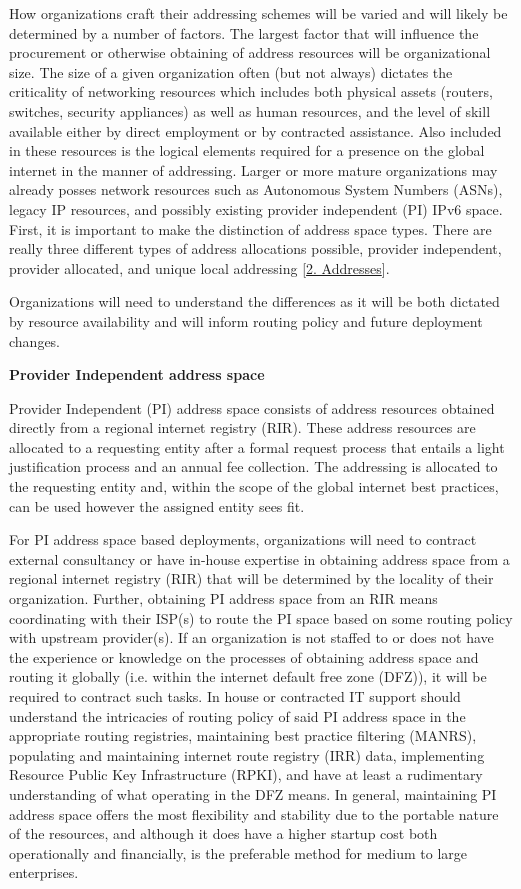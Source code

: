 \documentclass[
]{article}
\begin{document}
How organizations craft their addressing schemes will be varied and will
likely be determined by a number of factors. The largest factor that
will influence the procurement or otherwise obtaining of address
resources will be organizational size. The size of a given organization
often (but not always) dictates the criticality of networking resources
which includes both physical assets (routers, switches, security
appliances) as well as human resources, and the level of skill available
either by direct employment or by contracted assistance. Also included
in these resources is the logical elements required for a presence on
the global internet in the manner of addressing. Larger or more mature
organizations may already posses network resources such as Autonomous
System Numbers (ASNs), legacy IP resources, and possibly existing
provider independent (PI) IPv6 space. First, it is important to make the
distinction of address space types. There are really three different
types of address allocations possible, provider independent, provider
allocated, and unique local addressing {[}\hyperref[addresses]{2.
Addresses}{]}.

Organizations will need to understand the differences as it will be both
dictated by resource availability and will inform routing policy and
future deployment changes.

\textbf{Provider Independent address space}

Provider Independent (PI) address space consists of address resources
obtained directly from a regional internet registry (RIR). These address
resources are allocated to a requesting entity after a formal request
process that entails a light justification process and an annual fee
collection. The addressing is allocated to the requesting entity and,
within the scope of the global internet best practices, can be used
however the assigned entity sees fit.

For PI address space based deployments, organizations will need to
contract external consultancy or have in-house expertise in obtaining
address space from a regional internet registry (RIR) that will be
determined by the locality of their organization. Further, obtaining PI
address space from an RIR means coordinating with their ISP(s) to route
the PI space based on some routing policy with upstream provider(s). If
an organization is not staffed to or does not have the experience or
knowledge on the processes of obtaining address space and routing it
globally (i.e. within the internet default free zone (DFZ)), it will be
required to contract such tasks. In house or contracted IT support
should understand the intricacies of routing policy of said PI address
space in the appropriate routing registries, maintaining best practice
filtering (MANRS), populating and maintaining internet route registry
(IRR) data, implementing Resource Public Key Infrastructure (RPKI), and
have at least a rudimentary understanding of what operating in the DFZ
means. In general, maintaining PI address space offers the most
flexibility and stability due to the portable nature of the resources,
and although it does have a higher startup cost both operationally and
financially, is the preferable method for medium to large enterprises.
\end{document}
